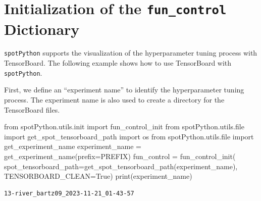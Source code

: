\documentclass[
  letterpaper,
  DIV=11,
  numbers=noendperiod]{scrreprt}
\newenvironment{Shaded}{\begin{snugshade}}{\end{snugshade}}
\newcommand{\BuiltInTok}[1]{\textcolor[rgb]{0.00,0.23,0.31}{#1}}
\newcommand{\ImportTok}[1]{\textcolor[rgb]{0.00,0.46,0.62}{#1}}
\newcommand{\NormalTok}[1]{\textcolor[rgb]{0.00,0.23,0.31}{#1}}
\newcommand{\OperatorTok}[1]{\textcolor[rgb]{0.37,0.37,0.37}{#1}}
\newcommand{\VariableTok}[1]{\textcolor[rgb]{0.07,0.07,0.07}{#1}}
\begin{document}
\hypertarget{initialization-of-the-fun_control-dictionary}{%
\section{\texorpdfstring{Initialization of the \texttt{fun\_control}
Dictionary}{Initialization of the fun\_control Dictionary}}\label{initialization-of-the-fun_control-dictionary}}

\texttt{spotPython} supports the visualization of the hyperparameter
tuning process with TensorBoard. The following example shows how to use
TensorBoard with \texttt{spotPython}.

First, we define an ``experiment name'' to identify the hyperparameter
tuning process. The experiment name is also used to create a directory
for the TensorBoard files.

\begin{Shaded}
\begin{Highlighting}[]
\ImportTok{from}\NormalTok{ spotPython.utils.init }\ImportTok{import}\NormalTok{ fun\_control\_init}
\ImportTok{from}\NormalTok{ spotPython.utils.}\BuiltInTok{file} \ImportTok{import}\NormalTok{ get\_spot\_tensorboard\_path}
\ImportTok{import}\NormalTok{ os}
\ImportTok{from}\NormalTok{ spotPython.utils.}\BuiltInTok{file} \ImportTok{import}\NormalTok{ get\_experiment\_name}
\NormalTok{experiment\_name }\OperatorTok{=}\NormalTok{ get\_experiment\_name(prefix}\OperatorTok{=}\NormalTok{PREFIX)}
\NormalTok{fun\_control }\OperatorTok{=}\NormalTok{ fun\_control\_init(}
\NormalTok{    spot\_tensorboard\_path}\OperatorTok{=}\NormalTok{get\_spot\_tensorboard\_path(experiment\_name),}
\NormalTok{    TENSORBOARD\_CLEAN}\OperatorTok{=}\VariableTok{True}\NormalTok{)}
\BuiltInTok{print}\NormalTok{(experiment\_name)}
\end{Highlighting}
\end{Shaded}

\begin{verbatim}
13-river_bartz09_2023-11-21_01-43-57
\end{verbatim}
\end{document}
